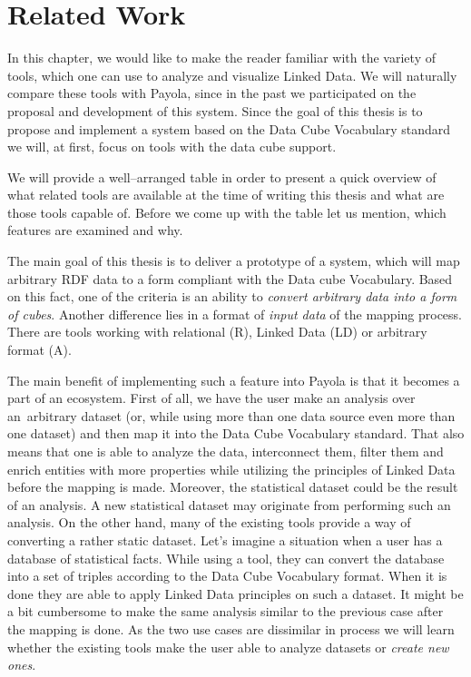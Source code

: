 \chapter{Related Work}
\label{chap:rw}

In this chapter, we would like to make the reader familiar with the variety of tools, which one can
use to analyze and visualize Linked Data. We will naturally compare these tools with
Payola, since in the past we participated on the proposal and development of this system.
Since the goal of this thesis is to propose and implement a system based on the Data Cube Vocabulary
standard we will, at first, focus on tools with the data cube support. 

We will provide a well--arranged table in order to present a quick overview of
what related tools are available at the time of writing this thesis and what are those 
tools capable of. Before we come up with the table let us mention, which
features are examined and why.

The main goal of this thesis is to deliver a prototype of a system, which will map 
arbitrary RDF data to a form compliant with the Data cube Vocabulary. Based on 
this fact, one of the criteria is an ability to \emph{convert arbitrary data 
into a form of cubes}. Another difference lies in a format of \emph{input data} of the
mapping process. There are tools working with relational (R), Linked Data (LD) or
arbitrary format (A).

The main benefit of implementing such a feature into Payola is that it becomes a 
part of an ecosystem. First of all, we have the user make an analysis over an~arbitrary
dataset (or, while using more than one data source even more than one dataset)
and then map it into the Data Cube Vocabulary standard. That also means that one is able
to analyze the data, interconnect them, filter them and enrich entities with more properties
while utilizing the principles of Linked Data before the mapping is made. Moreover, the statistical
dataset could be the result of an analysis. A new statistical dataset may originate from performing
such an analysis. On the other hand, many of the existing 
tools provide a way of converting a rather static dataset. Let's imagine a situation when a 
user has a database of statistical facts. While using a tool, they can 
convert the database into a set of triples according to the Data Cube 
Vocabulary format. When it is done they are able to apply Linked Data principles
on such a dataset. It might be a bit cumbersome to make the same analysis similar to
the previous case after the mapping is done. As the two use cases are dissimilar in process 
we will learn whether the existing tools make the user able to analyze datasets or \emph{create new ones}.

